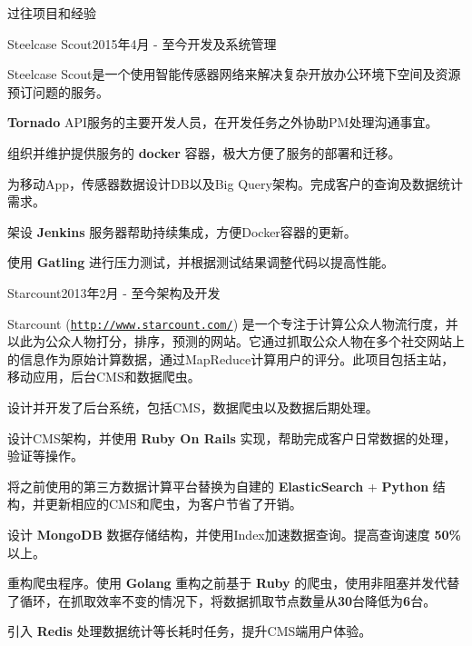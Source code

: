 \documentclass{resume} %
\newcommand{\http}{http:/\hspace{-0.3ex}/}
\newcommand{\kaiti}{\CJKfamily{kaiti}}
\begin{document}
\begin{rSection}{\kaiti 过往项目和经验}

\begin{rSubsection}{Steelcase Scout}{2015年4月 - 至今}{开发及系统管理}{}

    Steelcase Scout是一个使用智能传感器网络来解决复杂开放办公环境下空间及资源预订问题的服务。

\begin{rSubsectionList}
\item \textbf{Tornado} API服务的主要开发人员，在开发任务之外协助PM处理沟通事宜。
\item 组织并维护提供服务的 \textbf{docker} 容器，极大方便了服务的部署和迁移。
\item 为移动App，传感器数据设计DB以及Big Query架构。完成客户的查询及数据统计需求。
\item 架设 \textbf{Jenkins} 服务器帮助持续集成，方便Docker容器的更新。
\item 使用 \textbf{Gatling} 进行压力测试，并根据测试结果调整代码以提高性能。
\end{rSubsectionList}
\end{rSubsection}

\begin{rSubsection}{Starcount}{2013年2月 - 至今}{架构及开发}{}

Starcount (\href{http://www.starcount.com/}{\tt \http{}www.starcount.com/}) 是一个专注于计算公众人物流行度，并以此为公众人物打分，排序，预测的网站。它通过抓取公众人物在多个社交网站上的信息作为原始计算数据，通过MapReduce计算用户的评分。此项目包括主站，移动应用，后台CMS和数据爬虫。

\begin{rSubsectionList}
\item 设计并开发了后台系统，包括CMS，数据爬虫以及数据后期处理。
\item 设计CMS架构，并使用 \textbf{Ruby On Rails} 实现，帮助完成客户日常数据的处理，验证等操作。
\item 将之前使用的第三方数据计算平台替换为自建的 \textbf{ElasticSearch} + \textbf{Python} 结构，并更新相应的CMS和爬虫，为客户节省了开销。
\item 设计 \textbf{MongoDB} 数据存储结构，并使用Index加速数据查询。提高查询速度 \textbf{50\%} 以上。
\item 重构爬虫程序。使用 \textbf{Golang} 重构之前基于 \textbf{Ruby} 的爬虫，使用非阻塞并发代替了循环，在抓取效率不变的情况下，将数据抓取节点数量从\textbf{30}台降低为\textbf{6}台。
\item 引入 \textbf{Redis} 处理数据统计等长耗时任务，提升CMS端用户体验。
\end{rSubsectionList}
\end{rSubsection}



\end{rSection}
\end{document}
